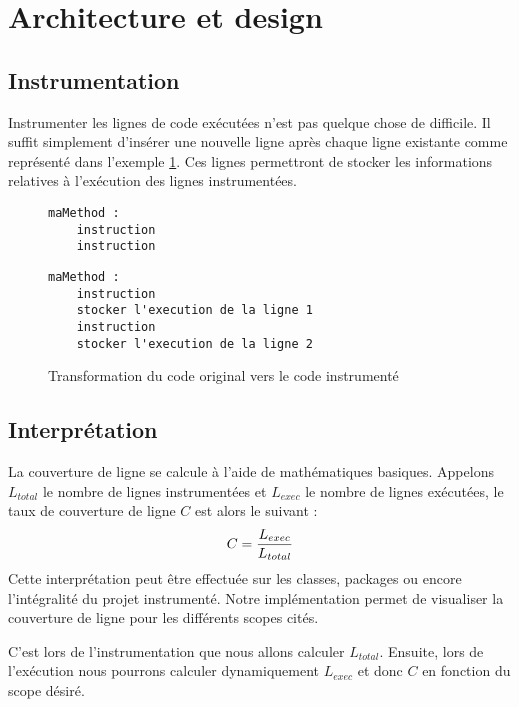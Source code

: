 \section{Architecture et design}

\subsection{Instrumentation}
\label{instrumentation}

Instrumenter les lignes de code exécutées n'est pas quelque chose de difficile. Il suffit simplement d'insérer une nouvelle ligne après chaque ligne existante comme représenté dans l'exemple   \ref{example_instrumentation}. Ces lignes permettront de stocker les informations relatives à l'exécution des lignes instrumentées.

\begin{figure}[h]

\begin{minipage}{.45\linewidth}

\begin{lstlisting}[linewidth=5.0cm]
maMethod :		
	instruction
	instruction
\end{lstlisting}

\end{minipage}
\hfill
\begin{minipage}{.45\linewidth}

\begin{lstlisting}[linewidth=11cm]
maMethod :
	instruction
	stocker l'execution de la ligne 1
	instruction
	stocker l'execution de la ligne 2
\end{lstlisting}

\end{minipage}


\caption{Transformation du code original vers le code instrumenté}
\label{example_instrumentation}
\end{figure}

\subsection{Interprétation}
\label{interpretation}

La couverture de ligne se calcule à l'aide de mathématiques basiques. Appelons $L_{total}$ le nombre de lignes instrumentées et $L_{exec}$ le nombre de lignes exécutées, le taux de couverture de ligne $C$ est alors le suivant :
\begin{equation}
C = { L_{exec} \over L_{total} }
\end{equation}
Cette interprétation peut être effectuée sur les classes, packages ou encore l'intégralité du projet instrumenté. Notre implémentation permet de visualiser la couverture de ligne pour les différents scopes cités.
\par C'est lors de l'instrumentation que nous allons calculer $L_{total}$. Ensuite, lors de l'exécution nous pourrons calculer dynamiquement $L_{exec}$ et donc $C$ en fonction du scope désiré.

